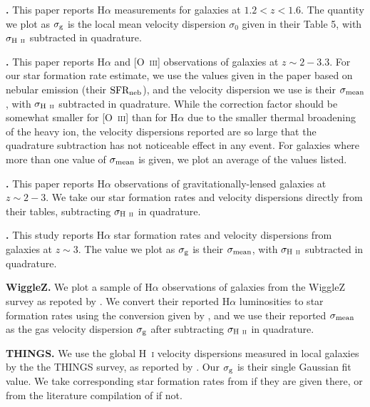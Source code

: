 \documentclass[useAMS,usenatbib]{mn2e}
\begin{document}
\begin{appendix}
\textbf{\citet{epinat09a}.} This paper reports H$\alpha$ measurements for galaxies at $1.2 < z < 1.6$. The quantity we plot as $\sigma_{\rm g}$ is the local mean velocity dispersion $\sigma_0$ given in their Table 5, with $\sigma_{\rm H~\textsc{ii}}$ subtracted in quadrature.

\textbf{\citet{law09a}.} This paper reports H$\alpha$ and [O~\textsc{iii}] observations of galaxies at $z\sim 2 - 3.3$. For our star formation rate estimate, we use the values given in the paper based on nebular emission (their $\mbox{SFR}_{\rm neb}$), and the velocity dispersion we use is their $\sigma_{\rm mean}$, with $\sigma_{\rm H~\textsc{ii}}$ subtracted in quadrature. While the correction factor should be somewhat smaller for [O~\textsc{iii}] than for H$\alpha$ due to the smaller thermal broadening of the heavy ion, the velocity dispersions reported are so large that the quadrature subtraction has not noticeable effect in any event. For galaxies where more than one value of $\sigma_{\rm mean}$  is given, we plot an average of the values listed.

\textbf{\citet{jones10a}.} This paper reports H$\alpha$ observations of gravitationally-lensed galaxies at $z\sim 2-3$. We take our star formation rates and velocity dispersions directly from their tables, subtracting $\sigma_{\rm H~\textsc{ii}}$ in quadrature.

\textbf{\citet{lemoine-busserolle10a}.} This study reports H$\alpha$ star formation rates and velocity dispersions from galaxies at $z\sim 3$. The value we plot as $\sigma_{\rm g}$ is their $\sigma_{\rm mean}$, with $\sigma_{\rm H~\textsc{ii}}$ subtracted in quadrature.

\textbf{WiggleZ.} We plot a sample of H$\alpha$ observations of galaxies from the WiggleZ survey as repoted by \citet{wisnioski11a}. We convert their reported H$\alpha$ luminosities to star formation rates using the conversion given by \citet{kennicutt12a}, and we use their reported $\sigma_{\rm mean}$ as the gas velocity dispersion $\sigma_{\rm g}$ after subtracting $\sigma_{\rm H~\textsc{ii}}$ in quadrature.

\textbf{THINGS.} We use the global H~\textsc{i} velocity dispersions measured in local galaxies by the the THINGS survey, as reported by \citet{ianjamasimanana12a}. Our $\sigma_{\rm g}$ is their single Gaussian fit value. We take corresponding star formation rates from \citet{leroy08a} if they are given there, or from the literature compilation of \citet{walter08a} if not.


\end{appendix}
\end{document}
